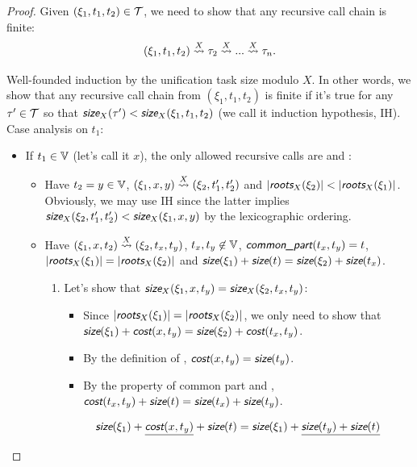 \begin{proof}
    Given $(\xi_1, t_1, t_2) \in \mathcal{T}$, we need to show that any recursive call chain is finite:
    \[(\xi_1, t_1, t_2) \mathrel{\overset{X}{\rightsquigarrow}} \tau_2 \mathrel{\overset{X}{\rightsquigarrow}} ... \mathrel{\overset{X}{\rightsquigarrow}} \tau_n.\]
    
    Well-founded induction by the unification task size modulo $X$. In other words, we show that any recursive call chain from $(\xi_1, t_1, t_2)$ is finite if it's true for any $\tau' \in \mathcal{T}$ so that $\size_X(\tau') < \size_X(\xi_1, t_1, t_2)$ (we call it induction hypothesis, IH). Case analysis on $t_1$:
    \begin{itemize}
        \item If $t_1 \in \mathbb{V}$ (let's call it $x$), the only allowed recursive calls are  and :
        \begin{itemize}
            \item Have $t_2 = y \in \mathbb{V}$, $(\xi_1, x, y) \mathrel{\overset{X}{\rightsquigarrow}} (\xi_2, t_1', t_2')$ and $|\roots_X(\xi_2)| < |\roots_X(\xi_1)|$. Obviously, we may use IH since the latter implies $\size_X(\xi_2, t_1', t_2') < \size_X(\xi_1, x, y)$ by the lexicographic ordering.
            \item Have $(\xi_1, x, t_2) \mathrel{\overset{X}{\rightsquigarrow}} (\xi_2, t_x, t_y)$, $t_x, t_y \not\in \mathbb{V}$, $\commonpart(t_x, t_y) = t$, $|\roots_X(\xi_1)| = |\roots_X(\xi_2)|$ and $\size(\xi_1) + \size(t) = \size(\xi_2) + \size(t_x)$.
            \begin{enumerate}
                \item Let's show that $\size_X(\xi_1, x, t_y) = \size_X(\xi_2, t_x, t_y)$:
                \begin{itemize}
                    \item Since $|\roots_X(\xi_1)| = |\roots_X(\xi_2)|$, we only need to show that $\size(\xi_1) + \cost(x, t_y) = \size(\xi_2) + \cost(t_x, t_y)$.
                    \item By the definition of \cost, $\cost(x, t_y) = \size(t_y)$.
                    \item By the property of common part and \cost, $\cost(t_x, t_y) + \size(t) = \size(t_x) + \size(t_y)$.
                \end{itemize}
                \begin{equation*}
                    \begin{array}{r@{{}={}}l}
                        \size(\xi_1) + \underline{\cost(x, t_y)} + \size(t) & \size(\xi_1) + \underline{\size(t_y) + \size(t)} \\

\end{array}
\end{equation*}
\end{enumerate}
\end{itemize}
\end{itemize}
\end{proof}
